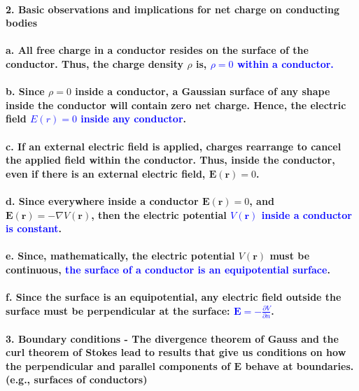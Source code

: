 \documentclass{article}
\begin{document}
\paragraph{2. Basic observations and implications for net charge on conducting bodies}
\paragraph{\indent a. All free charge in a conductor resides on the surface of the conductor. Thus, the charge density $\rho$ is, \textcolor{blue}{$\rho = 0$ within a conductor.}}
\paragraph{\indent b. Since $\rho=0$ inside a conductor, a Gaussian surface of any shape inside the conductor will contain zero net charge. Hence, the electric field \textcolor{blue}{$E(r)=0$ inside any conductor}.}
\paragraph{\indent c. If an external electric field is applied, charges rearrange to cancel the applied field within the conductor. Thus, inside the conductor, even if there is an external electric field, $\boldsymbol{E(r)}=0$.}
\paragraph{\indent d. Since everywhere inside a conductor $\boldsymbol{E(r)}=0$, and $\boldsymbol{E(r)}=-\nabla V(\boldsymbol{r})$, then the electric potential \textcolor{blue}{$V(\boldsymbol{r})$ inside a conductor is constant}.}
\paragraph{\indent e. Since, mathematically, the electric potential $V(\boldsymbol{r})$ must be continuous, \textcolor{blue}{the surface of a conductor is an equipotential surface}.}
\paragraph{\indent f. Since the surface is an equipotential, any electric field outside the surface must be perpendicular at the surface: \textcolor{blue}{$\boldsymbol{E}=-\frac{\partial V}{\partial n}$}.}
\paragraph{3. Boundary conditions - The divergence theorem of Gauss and the curl theorem of Stokes lead to results that give us conditions on how the perpendicular and parallel components of $\boldsymbol{E}$ behave at boundaries. (e.g., surfaces of conductors)}
\end{document}
